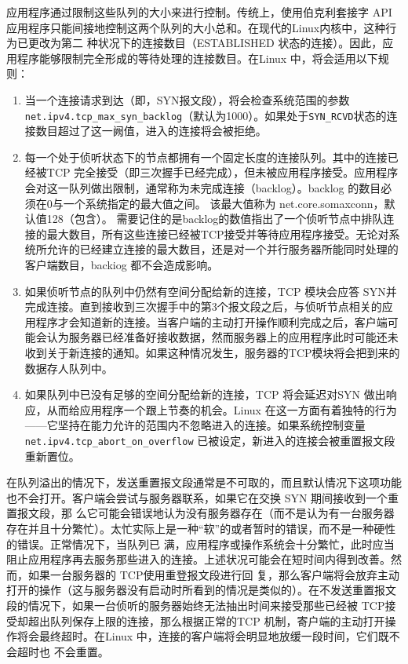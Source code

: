 应用程序通过限制这些队列的大小来进行控制。传统上，使用伯克利套接字 API 应用程序只能间接地控制这两个队列的大小总和。在现代的Linux内核中，这种行为已更改为第二
种状况下的连接数目（ESTABLISHED 状态的连接）。因此，应用程序能够限制完全形成的等待处理的连接数目。在Linux 中，将会适用以下规则：
\begin{enumerate}
	\item 当一个连接请求到达（即，SYN报文段），将会检查系统范围的参数 \verb|net.ipv4.tcp_max_syn_backlog|（默认为1000）。如果处于\verb|SYN_RCVD|状态的连接数目超过了这一阙值，进入的连接将会被拒绝。
	\item 每一个处于侦听状态下的节点都拥有一个固定长度的连接队列。其中的连接已经被TCP 完全接受（即三次握手已经完成），但未被应用程序接受。应用程序会对这一队列做出限制，通常称为未完成连接（backlog）。backlog 的数目必须在0与一个系统指定的最大值之间。
	      该最大值称为 net.core.somaxconn，默认值128（包含）。
	      需要记住的是backlog的数值指出了一个侦听节点中排队连接的最大数目，所有这些连接已经被TCP接受并等待应用程序接受。无论对系统所允许的已经建立连接的最大数目，还是对一个并行服务器所能同时处理的客户端数目，backiog 都不会造成影响。
	\item 如果侦听节点的队列中仍然有空间分配给新的连接，TCP 模块会应答 SYN并完成连接。直到接收到三次握手中的第3个报文段之后，与侦听节点相关的应用程序才会知道新的连接。当客户端的主动打开操作顺利完成之后，客户端可能会认为服务器已经准备好接收数据，然而服务器上的应用程序此时可能还未收到关于新连接的通知。如果这种情况发生，服务器的TCP模块将会把到来的数据存人队列中。
	\item 如果队列中已没有足够的空间分配给新的连接，TCP 将会延迟对SYN 做出响应，从而给应用程序一个跟上节奏的机会。Linux 在这一方面有着独特的行为——它坚持在能力允许的范围内不忽略进入的连接。如果系统控制变量 \verb|net.ipv4.tcp_abort_on_overflow| 已被设定，新进入的连接会被重置报文段重新置位。
\end{enumerate}

在队列溢出的情况下，发送重置报文段通常是不可取的，而且默认情况下这项功能也不会打开。客户端会尝试与服务器联系，如果它在交换 SYN 期间接收到一个重置报文段，那
么它可能会错误地认为没有服务器存在（而不是认为有一台服务器存在并且十分繁忙）。太忙实际上是一种“软”的或者暂时的错误，而不是一种硬性的错误。正常情况下，当队列已
满，应用程序或操作系统会十分繁忙，此时应当阻止应用程序再去服务那些进入的连接。上述状况可能会在短时间内得到改善。然而，如果一台服务器的 TCP使用重登报文段进行回
复，那么客户端将会放弃主动打开的操作（这与服务器没有启动时所看到的情况是类似的）。在不发送重置报文段的情况下，如果一台侦听的服务器始终无法抽出时间来接受那些已经被
TCP接受却超出队列保存上限的连接，那么根据正常的TCP 机制，寄户端的主动打开操作将会最终超时。在Linux 中，连接的客户端将会明显地放缓一段时间，它们既不会超时也
不会重置。

